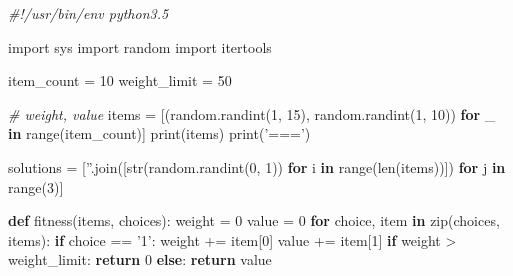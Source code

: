 \documentclass[12pt]{article}
\newenvironment{Shaded}{}{}
\newcommand{\KeywordTok}[1]{\textcolor[rgb]{0.00,0.44,0.13}{\textbf{{#1}}}}
\newcommand{\DecValTok}[1]{\textcolor[rgb]{0.25,0.63,0.44}{{#1}}}
\newcommand{\StringTok}[1]{\textcolor[rgb]{0.25,0.44,0.63}{{#1}}}
\newcommand{\CommentTok}[1]{\textcolor[rgb]{0.38,0.63,0.69}{\textit{{#1}}}}
\newcommand{\NormalTok}[1]{{#1}}
\newcommand{\ImportTok}[1]{{#1}}
\newcommand{\ControlFlowTok}[1]{\textcolor[rgb]{0.00,0.44,0.13}{\textbf{{#1}}}}
\newcommand{\OperatorTok}[1]{\textcolor[rgb]{0.40,0.40,0.40}{{#1}}}
\newcommand{\BuiltInTok}[1]{{#1}}
\begin{document}
\begin{Shaded}
\begin{Highlighting}[]
\CommentTok{#!/usr/bin/env python3.5}

\ImportTok{import} \NormalTok{sys}
\ImportTok{import} \NormalTok{random}
\ImportTok{import} \NormalTok{itertools}

\NormalTok{item_count }\OperatorTok{=} \DecValTok{10}
\NormalTok{weight_limit }\OperatorTok{=} \DecValTok{50}

\CommentTok{# weight, value}
\NormalTok{items }\OperatorTok{=} \NormalTok{[(random.randint(}\DecValTok{1}\NormalTok{, }\DecValTok{15}\NormalTok{), random.randint(}\DecValTok{1}\NormalTok{, }\DecValTok{10}\NormalTok{))}
         \ControlFlowTok{for} \NormalTok{_ }\KeywordTok{in} \BuiltInTok{range}\NormalTok{(item_count)]}
\BuiltInTok{print}\NormalTok{(items)}
\BuiltInTok{print}\NormalTok{(}\StringTok{'==='}\NormalTok{)}

\NormalTok{solutions }\OperatorTok{=} \NormalTok{[}\StringTok{''}\NormalTok{.join([}\BuiltInTok{str}\NormalTok{(random.randint(}\DecValTok{0}\NormalTok{, }\DecValTok{1}\NormalTok{))}
             \ControlFlowTok{for} \NormalTok{i }\KeywordTok{in} \BuiltInTok{range}\NormalTok{(}\BuiltInTok{len}\NormalTok{(items))])}
             \ControlFlowTok{for} \NormalTok{j }\KeywordTok{in} \BuiltInTok{range}\NormalTok{(}\DecValTok{3}\NormalTok{)]}

\KeywordTok{def} \NormalTok{fitness(items, choices):}
    \NormalTok{weight }\OperatorTok{=} \DecValTok{0}
    \NormalTok{value }\OperatorTok{=} \DecValTok{0}
    \ControlFlowTok{for} \NormalTok{choice, item }\KeywordTok{in} \BuiltInTok{zip}\NormalTok{(choices, items):}
        \ControlFlowTok{if} \NormalTok{choice }\OperatorTok{==} \StringTok{'1'}\NormalTok{:}
            \NormalTok{weight }\OperatorTok{+=} \NormalTok{item[}\DecValTok{0}\NormalTok{]}
            \NormalTok{value }\OperatorTok{+=} \NormalTok{item[}\DecValTok{1}\NormalTok{]}
    \ControlFlowTok{if} \NormalTok{weight }\OperatorTok{>} \NormalTok{weight_limit:}
        \ControlFlowTok{return} \DecValTok{0}
    \ControlFlowTok{else}\NormalTok{:}
        \ControlFlowTok{return} \NormalTok{value}


\end{Highlighting}
\end{Shaded}
\end{document}
